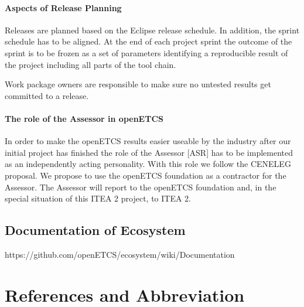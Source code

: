 \documentclass{template/openetcs_article}
\begin{document}
\paragraph{Aspects of Release Planning}
Releases are planned based on the Eclipse release schedule. In addition, the sprint schedule has to be aligned. At the end of each project sprint the outcome of the sprint is to be frozen as a set of parameters identifying a reproducible result of the project including all parts of the tool chain. 

Work package owners are responsible to make sure no untested results get committed to a release.


\paragraph{The role of the Assessor in openETCS}
In order to make the openETCS results easier useable by the industry after our initial project has finished the role of the Assessor [ASR] has to be implemented as an independently acting personality. With this role we follow the CENELEG proposal. We propose to use the openETCS foundation as a contractor for the Assessor. The Assessor will report to the openETCS foundation and, in the special situation of this ITEA 2 project, to ITEA 2.



\subsection{Documentation of Ecosystem}
https://github.com/openETCS/ecosystem/wiki/Documentation



\section{References and Abbreviation}
\end{document}
